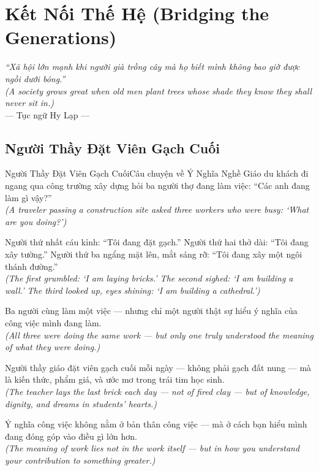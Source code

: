 \chapter{Kết Nối Thế Hệ (Bridging the Generations)}
\begin{center}
  \textit{\color{truyengold}``Xã hội lớn mạnh khi người già trồng cây mà họ biết mình không bao giờ được ngồi dưới bóng.''}\\[4pt]
  \textit{(A society grows great when old men plant trees whose shade they know they shall never sit in.)}\\[4pt]
  \small\color{truyenblue}--- Tục ngữ Hy Lạp ---
\end{center}
\ngancach

\section{Người Thầy Đặt Viên Gạch Cuối}
\begin{truyen}{Người Thầy Đặt Viên Gạch Cuối}{Câu chuyện về Ý Nghĩa Nghề Giáo}
 du khách đi ngang qua công trường xây dựng hỏi ba người thợ đang làm việc: ``Các anh đang làm gì vậy?''\\[4pt]
\textit{(A traveler passing a construction site asked three workers who were busy: `What are you doing?')}

Người thứ nhất cáu kỉnh: ``Tôi đang đặt gạch.'' Người thứ hai thở dài: ``Tôi đang xây tường.'' Người thứ ba ngẩng mặt lên, mắt sáng rỡ: ``Tôi đang xây một ngôi thánh đường.''\\[4pt]
\textit{(The first grumbled: `I am laying bricks.' The second sighed: `I am building a wall.' The third looked up, eyes shining: `I am building a cathedral.')}

Ba người cùng làm một việc --- nhưng chỉ một người thật sự hiểu ý nghĩa của công việc mình đang làm.\\[4pt]
\textit{(All three were doing the same work --- but only one truly understood the meaning of what they were doing.)}

Người thầy giáo đặt viên gạch cuối mỗi ngày --- không phải gạch đất nung --- mà là kiến thức, phẩm giá, và ước mơ trong trái tim học sinh.\\[4pt]
\textit{(The teacher lays the last brick each day --- not of fired clay --- but of knowledge, dignity, and dreams in students' hearts.)}

\end{truyen}
\begin{baihoc}
  Ý nghĩa công việc không nằm ở bản thân công việc --- mà ở cách bạn hiểu mình đang đóng góp vào điều gì lớn hơn.\\[4pt]
  \textit{(The meaning of work lies not in the work itself --- but in how you understand your contribution to something greater.)}
\end{baihoc}

